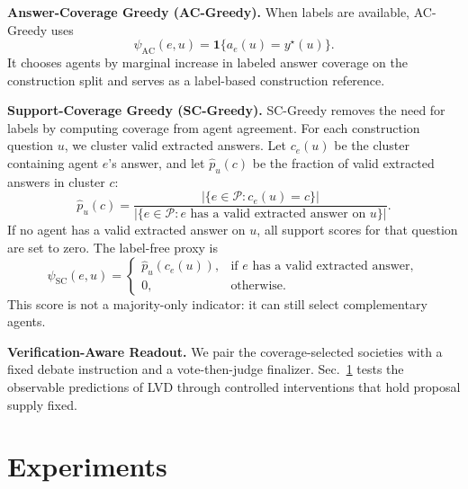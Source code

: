 \documentclass{article}
\newcommand{\secref}[1]{Sec.~\ref{#1}}
\begin{document}
\textbf{Answer-Coverage Greedy (AC-Greedy).}
When labels are available, AC-Greedy uses
\begin{equation}
    \psi_{\mathrm{AC}}(e,u)=\mathbf 1\{a_e(u)=y^\star(u)\}.
    \label{eq:answer_coverage_proxy}
\end{equation}
It chooses agents by marginal increase in labeled answer coverage on the
construction split and serves as a label-based construction reference.

\textbf{Support-Coverage Greedy (SC-Greedy).}
SC-Greedy removes the need for labels by computing coverage from agent agreement. For each
construction question $u$, we cluster valid extracted answers. Let $c_e(u)$ be
the cluster containing agent $e$'s answer, and let $\widehat p_u(c)$ be the
fraction of valid extracted answers in cluster $c$:
\[
    \widehat p_u(c)
    =
    \frac{
    |\{e\in\mathcal P:c_e(u)=c\}|
    }{
    |\{e\in\mathcal P:e\text{ has a valid extracted answer on }u\}|
    }.
\]
If no agent has a valid extracted answer on $u$, all support scores for that
question are set to zero. The label-free proxy is
\begin{equation}
    \psi_{\mathrm{SC}}(e,u)=
    \begin{cases}
    \widehat p_u(c_e(u)), & \text{if }e\text{ has a valid extracted answer},\\
    0, & \text{otherwise.}
    \end{cases}
    \label{eq:support_coverage_proxy}
\end{equation}
This score is not a majority-only indicator: it can
still select complementary agents.

\textbf{Verification-Aware Readout.}
We pair the coverage-selected societies with a fixed debate instruction and a
vote-then-judge finalizer. \secref{sec:experiments} tests the observable
predictions of LVD through controlled interventions that hold proposal supply
fixed.



\section{Experiments}
\label{sec:experiments}
\end{document}

